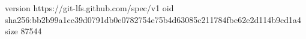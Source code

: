 version https://git-lfs.github.com/spec/v1
oid sha256:bb2b99a1cc39d0791db0e0782754e75b4d63085c211784fbe62e2d114b9cd1a4
size 87544
